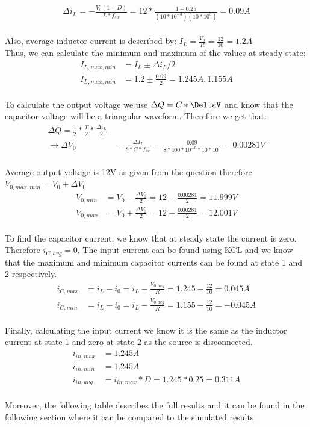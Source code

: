 \documentclass{article}
\begin{document}
\begin{align*}
    \Delta i_L = -\frac{V_0 (1-D)}{L*f_{sw}} = 12 * \frac{1-0.25}{(10*10^{-3})(10*10^3)} = 0.09A
\end{align*}
\\Also, average inductor current is described by: $I_L = \frac{V_0}{R} = \frac{12}{10} = 1.2A$
\\Thus, we can calculate the minimum and maximum of the values at steady state:
\begin{align*}
    I_{L,max,min} &= I_L \pm \Delta i_L / 2 \\
    I_{L,max,min} &= 1.2 \pm \frac{0.09}{2} = 1.245A, 1.155 A
\end{align*}
\\To calculate the output voltage we use $\Delta Q = C*\DeltaV$ and know that the capacitor voltage will be a triangular waveform. Therefore we get that:
\begin{align*}
    \Delta Q = \frac{1}{2}*\frac{T}{2}*\frac{\Delta i_L}{2}\\
    \rightarrow \Delta V_0 &= \frac{\Delta I_L}{8*C*f_{sw}} = \frac{0.09}{8*400*10^{-6}*10*10^3} = 0.00281V
\end{align*}
\\Average output voltage is 12V as given from the question therefore $V_{0,max,min} = V_0 \pm \Delta V_0$
\begin{align*}
    V_{0,min} &= V_0 - \frac{\Delta V_0}{2} = 12 - \frac{0.00281}{2} = 11.999V\\
    V_{0,max} &= V_0 + \frac{\Delta V_0}{2} = 12 - \frac{0.00281}{2} = 12.001V
\end{align*}
\\ To find the capacitor current, we know that at steady state the current is zero. Therefore $i_{C,avg} =0$. The input current can be found using KCL and we know that the maximum and minimum capacitor currents can be found at state 1 and 2 respectively.
\begin{align*}
    i_{C,max} &= i_L - i_0 = i_L - \frac{V_{0,avg}}{R} = 1.245 - \frac{12}{10} = 0.045A \\
    i_{C,min} &= i_L - i_0 = i_L - \frac{V_{0,avg}}{R} = 1.155 - \frac{12}{10} = -0.045A 
\end{align*}
\\Finally, calculating the input current we know it is the same as the inductor current at state 1 and zero at state 2 as the source is disconnected.
\begin{align*}
    i_{in,max} &= 1.245A \\
    i_{in,min} &= 1.245A \\
    i_{in,avg} &= i_{in,max} * D = 1.245*0.25 = 0.311A
\end{align*}
\\Moreover, the following table describes the full results and it can be found in the following section where it can be compared to the simulated results:
\end{document}
